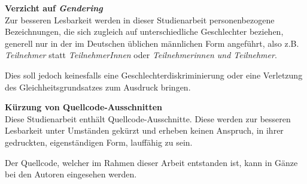 \vfill
\textbf{Verzicht auf \textit{Gendering}} \\
Zur besseren Lesbarkeit werden in dieser Studienarbeit personenbezogene Bezeichnungen, die sich zugleich auf unterschiedliche Geschlechter beziehen, generell nur in der im Deutschen üblichen männlichen Form angeführt, also z.B. \textit{Teilnehmer} statt \textit{TeilnehmerInnen} oder \textit{Teilnehmerinnen und Teilnehmer}.

Dies soll jedoch keinesfalls eine Geschlechterdiskriminierung oder eine Verletzung des Gleichheitsgrundsatzes zum Ausdruck bringen.

\textbf{Kürzung von Quellcode-Ausschnitten} \\
Diese Studienarbeit enthält Quellcode-Ausschnitte. Diese werden zur besseren Lesbarkeit unter Umständen gekürzt und erheben keinen Anspruch, in ihrer gedruckten, eigenständigen Form, lauffähig zu sein.

Der Quellcode, welcher im Rahmen dieser Arbeit entstanden ist, kann in Gänze bei den Autoren eingesehen werden.

\vfill